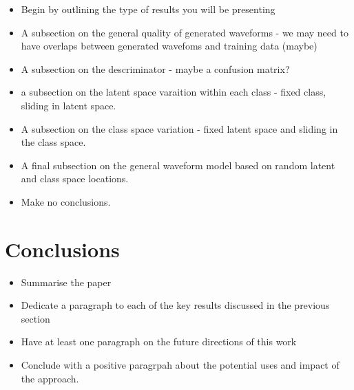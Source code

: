 \documentclass[12pt]{iopart}
\begin{document}
\begin{itemize}
\item Begin by outlining the type of results you will be presenting
\item A subsection on the general quality of generated waveforms - we may need
to have overlaps between generated wavefoms and training data (maybe)
\item A subsection on the descriminator - maybe a confusion matrix?
\item a subsection on the latent space varaition within each class - fixed
class, sliding in latent space.
\item A subsection on the class space variation - fixed latent space and
sliding in the class space.
\item A final subsection on the general waveform model based on random latent
and class space locations.
\item Make no conclusions.
\end{itemize}



\section{Conclusions}

\begin{itemize}
\item Summarise the paper
\item Dedicate a paragraph to each of the key results discussed in the previous
section
\item Have at least one paragraph on the future directions of this work
\item Conclude with a positive paragrpah about the potential uses and impact of
the approach.
\end{itemize}

\clearpage

\appendix
\end{document}

